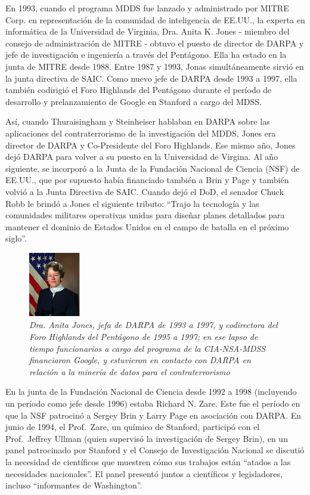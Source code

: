 \documentclass[10pt,a5paper,twoside,spanish,]{book}
\begin{document}
En 1993, cuando el programa MDDS fue lanzado y administrado por MITRE
Corp. en representación de la comunidad de inteligencia de EE.UU., la
experta en informática de la Universidad de Virginia, Dra. Anita K.
Jones - miembro del consejo de administración de MITRE - obtuvo el
puesto de director de DARPA y jefe de investigación e ingeniería a
través del Pentágono. Ella ha estado en la junta de MITRE desde 1988.
Entre 1987 y 1993, Jonas simultáneamente sirvió en la junta directiva de
SAIC. Como nuevo jefe de DARPA desde 1993 a 1997, ella también codirigió
el Foro Highlands del Pentágono durante el período de desarrollo y
prelanzamiento de Google en Stanford a cargo del MDSS.

Así, cuando Thuraisingham y Steinheiser hablaban en DARPA sobre las
aplicaciones del contraterrorismo de la investigación del MDDS, Jones
era director de DARPA y Co-Presidente del Foro Highlands. Ese mismo año,
Jones dejó DARPA para volver a su puesto en la Universidad de Virgina.
Al año siguiente, se incorporó a la Junta de la Fundación Nacional de
Ciencia (NSF) de EE.UU., que por supuesto había financiado también a
Brin y Page y también volvió a la Junta Directiva de SAIC. Cuando dejó
el DoD, el senador Chuck Robb le brindó a Jones el siguiente tributo:
``Trajo la tecnología y las comunidades militares operativas unidas para
diseñar planes detallados para mantener el dominio de Estados Unidos en
el campo de batalla en el próximo siglo''.

\begin{figure}[htbp]
\centering
\includegraphics{1.6.png}
\caption{\emph{Dra. Anita Jones, jefa de DARPA de 1993 a 1997, y
codirectora del Foro Highlands del Pentágono de 1995 a 1997; en ese
lapso de tiempo funcionarios a cargo del programa de la CIA-NSA-MDSS
financiaron Google, y estuvieron en contacto con DARPA en relación a la
minería de datos para el contraterrorismo}}
\end{figure}

En la junta de la Fundación Nacional de Ciencia desde 1992 a 1998
(incluyendo un período como jefe desde 1996) estaba Richard N. Zare.
Este fue el período en que la NSF patrocinó a Sergey Brin y Larry Page
en asociación con DARPA. En junio de 1994, el Prof.~Zare, un químico de
Stanford, participó con el Prof.~Jeffrey Ullman (quien supervisó la
investigación de Sergey Brin), en un panel patrocinado por Stanford y el
Consejo de Investigación Nacional se discutió la necesidad de
científicos que muestren cómo sus trabajos están ``atados a las
necesidades nacionales''. El panel presentó juntos a científicos y
legisladores, incluso ``informantes de Washington''.
\end{document}
